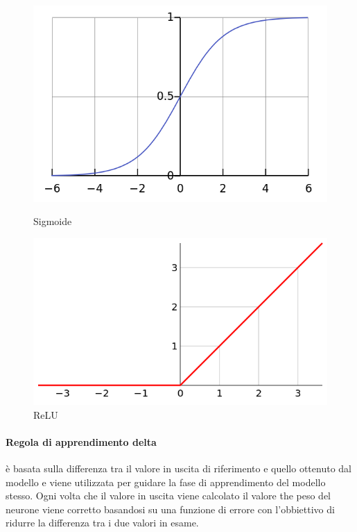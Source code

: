 \documentclass[%
    corpo=12pt,
    twoside,
    oldstyle,
    autoretitolo,
    greek,
    evenboxes,
]{toptesi}
\begin{document}
\begin{figure}
  \centering
  \begin{minipage}{.5\textwidth}
    \centering
    \includegraphics[width=0.8\linewidth]{figure/sigmoid.png}
    \caption{Sigmoide}
    \label{fig:sigmoid}
  \end{minipage}%
  \begin{minipage}{.5\textwidth}
    \centering
    \includegraphics[width=0.8\linewidth]{figure/relu.png}
    \caption{ReLU}
    \label{fig:relu}
  \end{minipage}
\end{figure}

\paragraph{Regola di apprendimento delta} è basata sulla differenza tra il valore in uscita di riferimento e quello ottenuto dal modello e viene utilizzata per guidare la fase di apprendimento del modello stesso. Ogni volta che il valore in uscita viene calcolato il valore the peso del neurone viene corretto basandosi su una funzione di errore con l'obbiettivo di ridurre la differenza tra i due valori in esame. 
\end{document}
